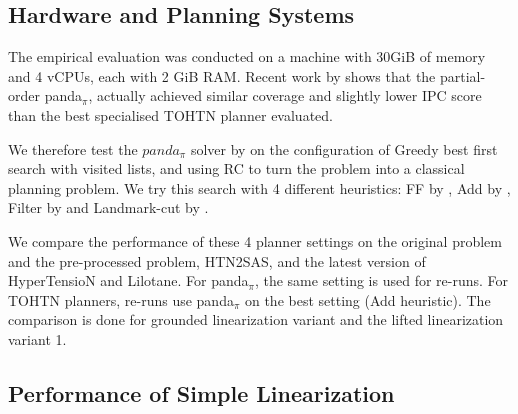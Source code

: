 \documentclass[letterpaper]{article} %
\begin{document}
\subsection{Hardware and Planning Systems}
The empirical evaluation was conducted on a machine with 30GiB of memory and 4 vCPUs, each with 2 GiB RAM. Recent work by \cite{HTN2SAS} shows that the partial-order panda$_\pi$, actually achieved similar coverage and slightly lower IPC score than the best specialised TOHTN planner evaluated. %

We therefore test the $panda_{\pi}$ solver by \cite{useClassicalHuristicICAPS18,useClassicalHeuristicIJCAI19,progressionsearchJAIR20} on the configuration of Greedy best first search with visited lists, and using RC to turn the problem into a classical planning problem. We try this search with 4 different heuristics: FF by \cite{FF}, Add by \cite{Add}, Filter by \cite{useClassicalHuristicICAPS18} and Landmark-cut by \cite{LM-Cut}.

We compare the performance of these 4 planner settings on the original problem and the pre-processed problem, HTN2SAS, and the latest version of HyperTensioN and Lilotane. For panda$_{\pi}$, the same setting is used for re-runs. For TOHTN planners, re-runs use panda$_{\pi}$ on the best setting (Add heuristic). The comparison is done for grounded linearization variant and the lifted linearization variant 1.

\subsection{Performance of Simple Linearization}
\end{document}
